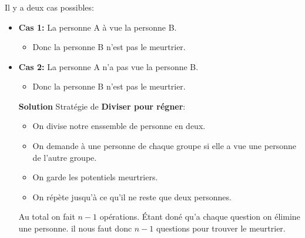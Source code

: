 \begin{frame}
    \frametitle{\problemtitle}
    Il y a deux cas possibles:
    \begin{itemize}
        \item<+-> \textbf{Cas 1:} La personne A à vue la personne B.
            \begin{itemize}
                \item Donc la personne B n'est pas le meurtrier.
            \end{itemize}
        \item<+-> \textbf{Cas 2:} La personne A n'a pas vue la personne B.
            \begin{itemize}
                \item Donc la personne B n'est pas le meurtrier.
            \end{itemize}

        \textbf{Solution} Stratégie de \textbf{Diviser pour régner}:
        \begin{itemize}
            \item<+-> On divise notre enssemble de personne en deux.
            \item<+-> On demande à une personne de chaque groupe si elle a vue une personne de l'autre groupe.
            \item<+-> On garde les potentiels meurtriers.
            \item<+-> On répète jusqu'à ce qu'il ne reste que deux personnes.
        \end{itemize}
        Au total on fait $n-1$ opérations. Étant doné qu'a chaque question on élimine une personne. il nous faut donc $n-1$ questions pour trouver le meurtrier.
    \end{itemize}
\end{frame}
